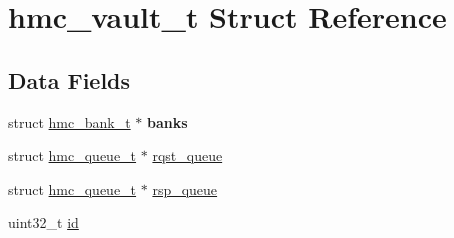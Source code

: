 \hypertarget{structhmc__vault__t}{\section{hmc\-\_\-vault\-\_\-t Struct Reference}
\label{structhmc__vault__t}
}
\subsection*{Data Fields}
\begin{DoxyCompactItemize}
\item 
\hypertarget{structhmc__vault__t_aeb6f69ac6b76a660ac1d0111beac630f}{struct \hyperlink{structhmc__bank__t}{hmc\-\_\-bank\-\_\-t} $\ast$ {\bfseries banks}}\label{structhmc__vault__t_aeb6f69ac6b76a660ac1d0111beac630f}

\item 
struct \hyperlink{structhmc__queue__t}{hmc\-\_\-queue\-\_\-t} $\ast$ \hyperlink{structhmc__vault__t_ae4e2005d2a68e9cb409bd2ba56fa77ab}{rqst\-\_\-queue}
\item 
struct \hyperlink{structhmc__queue__t}{hmc\-\_\-queue\-\_\-t} $\ast$ \hyperlink{structhmc__vault__t_a9bf96f2d49d0a73a779bc200df7e9ca1}{rsp\-\_\-queue}
\item 
uint32\-\_\-t \hyperlink{structhmc__vault__t_a012fc49283e599603322364abcbaa00a}{id}
\end{DoxyCompactItemize}


